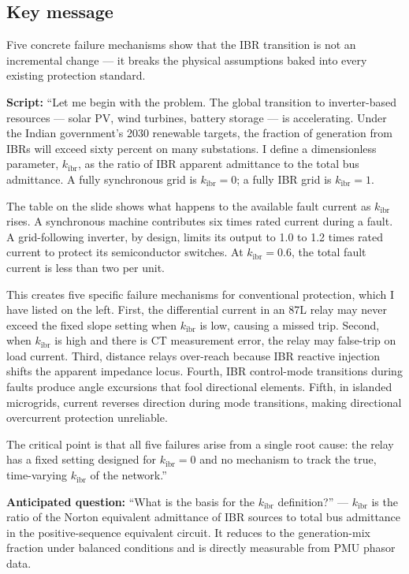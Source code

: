 \documentclass[11pt,a4paper]{article}
\newcommand{\script}[1]{\begin{scriptbox}\textbf{Script:} #1\end{scriptbox}}
\newcommand{\anticipate}[1]{\begin{warnbox}\textbf{Anticipated question:} #1\end{warnbox}}
\newcommand{\kibr}{k_{\mathrm{ibr}}}
\begin{document}
\subsection*{Key message}
Five concrete failure mechanisms show that the IBR transition is not an incremental
change — it breaks the physical assumptions baked into every existing protection standard.

\script{%
``Let me begin with the problem. The global transition to inverter-based resources ---
solar PV, wind turbines, battery storage --- is accelerating. Under the Indian government's
2030 renewable targets, the fraction of generation from IBRs will exceed sixty percent on
many substations. I define a dimensionless parameter, $\kibr$, as the ratio of IBR
apparent admittance to the total bus admittance. A fully synchronous grid is $\kibr = 0$;
a fully IBR grid is $\kibr = 1$.

The table on the slide shows what happens to the available fault current as $\kibr$ rises.
A synchronous machine contributes six times rated current during a fault. A grid-following
inverter, by design, limits its output to 1.0 to 1.2 times rated current to protect its
semiconductor switches. At $\kibr = 0.6$, the total fault current is less than two per unit.

This creates five specific failure mechanisms for conventional protection, which I have
listed on the left. First, the differential current in an 87L relay may never exceed the
fixed slope setting when $\kibr$ is low, causing a missed trip. Second, when $\kibr$ is
high and there is CT measurement error, the relay may false-trip on load current. Third,
distance relays over-reach because IBR reactive injection shifts the apparent impedance
locus. Fourth, IBR control-mode transitions during faults produce angle excursions that
fool directional elements. Fifth, in islanded microgrids, current reverses direction
during mode transitions, making directional overcurrent protection unreliable.

The critical point is that all five failures arise from a single root cause: the relay
has a fixed setting designed for $\kibr = 0$ and no mechanism to track the true,
time-varying $\kibr$ of the network.''%
}

\anticipate{``What is the basis for the $\kibr$ definition?'' ---
$\kibr$ is the ratio of the Norton equivalent admittance of IBR sources to total bus
admittance in the positive-sequence equivalent circuit. It reduces to the
generation-mix fraction under balanced conditions and is directly measurable from PMU
phasor data.}
\end{document}
